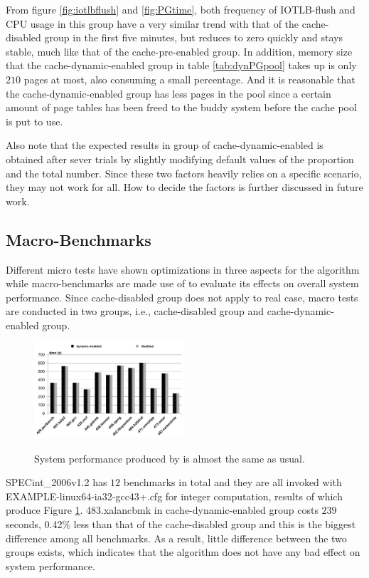 From figure \ref{fig:iotlbflush} and \ref{fig:PGtime}, both frequency of IOTLB-flush and CPU usage in this group have a very similar trend with that of the cache-disabled group in the first five minutes, but reduces to zero quickly and stays stable, much like that of the cache-pre-enabled group. In addition, memory size that the cache-dynamic-enabled group in table \ref{tab:dynPGpool} takes up is only $210$ pages at most, also consuming a small percentage. And it is reasonable that the cache-dynamic-enabled group has less pages in the pool since a certain amount of page tables has been freed to the buddy system before the cache pool is put to use.

Also note that the expected results in group of cache-dynamic-enabled is obtained after sever trials by slightly modifying default values of the proportion and the total number. Since these two factors heavily relies on a specific scenario, they may not work for all. How to decide the factors is further discussed in future work.

\subsection{Macro-Benchmarks}

Different micro tests have shown optimizations in three aspects for the algorithm while macro-benchmarks are made use of to evaluate its effects on overall system performance. Since cache-disabled group does not apply to real case, macro tests are conducted in two groups, i.e., cache-disabled group and cache-dynamic-enabled group.

\begin{figure}[htp]
\centering
\includegraphics[width=0.5\textwidth]{image/macro/spec.png} \\
\caption{System performance produced by \name is almost the same as usual.}
\label{fig:spec}
\end{figure}

SPECint\_2006v1.2 has $12$ benchmarks in total and they are all invoked with EXAMPLE-linux64-ia32-gcc43+.cfg for integer computation, results of which produce Figure \ref{fig:spec}. 483.xalancbmk in cache-dynamic-enabled group costs $239$ seconds, 0.42\% less
than that of the cache-disabled group and this is the biggest difference among all benchmarks. As a result, little difference between the two groups exists, which indicates that the algorithm does not have any bad effect on system performance.

